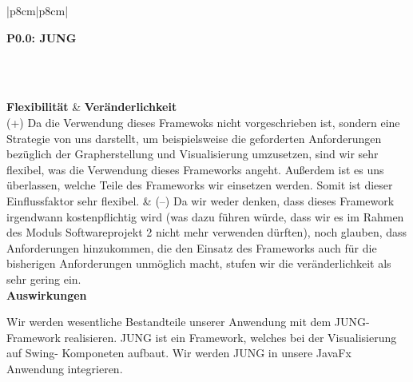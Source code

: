 \documentclass[enabledeprecatedfontcommands,fontsize=11pt,paper=a4,twoside]{scrartcl}
\newcounter{one}
\newcounter{two}[one]
\newcommand{\tone}{0\theone}
\newcommand{\two}{\stepcounter{two}0\thetwo}
\begin{document}
\begin{tabular} {|p{8cm}|p{8cm}|}
	\hline
	 {\parbox{16cm}{\textbf{\hypertarget{k}{P\tone.\two}: JUNG }} } \\ \hline\hline 
	\rule{0pt}{9ex}\\ [3ex] \hline
	\textbf{Flexibilität}  & \textbf{Veränderlichkeit} \\
	(+) Da die Verwendung dieses Framewoks nicht vorgeschrieben ist, sondern eine Strategie von uns darstellt, um beispielsweise die geforderten Anforderungen bezüglich der Grapherstellung und Visualisierung umzusetzen, sind wir sehr flexibel, was die Verwendung dieses Frameworks angeht. Außerdem ist es uns überlassen, welche Teile des Frameworks wir einsetzen werden. Somit ist dieser Einflussfaktor sehr flexibel. & 
	(--) Da wir weder denken, dass dieses Framework irgendwann kostenpflichtig wird (was dazu führen würde, dass wir es im Rahmen des Moduls Softwareprojekt 2 nicht mehr verwenden dürften), noch glauben, dass Anforderungen hinzukommen, die den Einsatz des Frameworks auch für die bisherigen Anforderungen unmöglich macht, stufen wir die veränderlichkeit als sehr gering ein. \\
	\hline
	 {\textbf{Auswirkungen}} \\
	 {\parbox{16cm}{Wir werden wesentliche Bestandteile unserer Anwendung mit dem JUNG-Framework realisieren. JUNG ist ein Framework, welches bei der Visualisierung auf Swing- Komponeten aufbaut. Wir werden JUNG in unsere JavaFx Anwendung integrieren. } }\\ \hline
\end{tabular}
\\ \\ \\ \\%

\newpage
\setcounter{two}{1}
\end{document}
